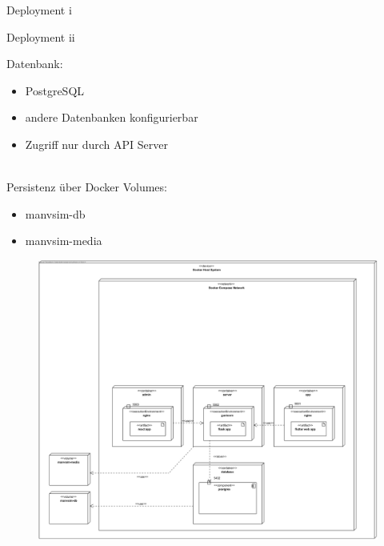 \begin{frame}{Deployment i}
\begin{minipage}[t]{0.63\textwidth}
\begin{figure}
\begin{center}
            \end{center}
        \end{figure}
    \end{minipage}
\end{frame}

\begin{frame}{Deployment ii}
    \begin{minipage}[t]{0.35\textwidth}
        Datenbank:
        \begin{itemize}
            \item PostgreSQL
            \item andere Datenbanken konfigurierbar
            \item Zugriff nur durch API Server
        \end{itemize}
        $ $\\
        Persistenz über Docker Volumes:
        \begin{itemize}
            \item manvsim-db
            \item manvsim-media
        \end{itemize}
    \end{minipage}
    \hfill
    \begin{minipage}[t]{0.63\textwidth}
        \begin{figure}
            \begin{center}
                \includegraphics[width=\textwidth]{images/deployment/deployment_diagram_database.jpg}
            \end{center}
        \end{figure}
    \end{minipage}
\end{frame}

